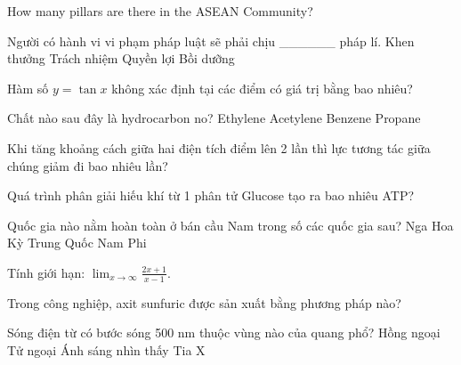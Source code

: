 \begin{ex}
    How many pillars are there in the ASEAN Community?
\end{ex}
\begin{ex}
    Người có hành vi vi phạm pháp luật sẽ phải chịu ______ pháp lí.
    \choice
    {Khen thưởng}
    {\True Trách nhiệm}
    {Quyền lợi}
    {Bồi dưỡng}
\end{ex}
\begin{ex}
    Hàm số $y = \tan x$ không xác định tại các điểm có giá trị bằng bao nhiêu?
\end{ex}
\begin{ex}
    Chất nào sau đây là hydrocarbon no?
    \choice
    {Ethylene}
    {Acetylene}
    {Benzene}
    {\True Propane}
\end{ex}
\begin{ex}
    Khi tăng khoảng cách giữa hai điện tích điểm lên 2 lần thì lực tương tác giữa chúng giảm đi bao nhiêu lần?
\end{ex}
\begin{ex}
    Quá trình phân giải hiếu khí từ 1 phân tử Glucose tạo ra bao nhiêu ATP?
\end{ex}
\begin{ex}
    Quốc gia nào nằm hoàn toàn ở bán cầu Nam trong số các quốc gia sau?
    \choice
    {Nga}
    {Hoa Kỳ}
    {Trung Quốc}
    {\True Nam Phi}
\end{ex}
\begin{ex}
    Tính giới hạn: $\lim_{x \to \infty} \frac{2x+1}{x-1}$.
\end{ex}
\begin{ex}
    Trong công nghiệp, axit sunfuric được sản xuất bằng phương pháp nào?
\end{ex}
\begin{ex}
    Sóng điện từ có bước sóng 500 nm thuộc vùng nào của quang phổ?
    \choice
    {Hồng ngoại}
    {Tử ngoại}
    {\True Ánh sáng nhìn thấy}
    {Tia X}
\end{ex}
